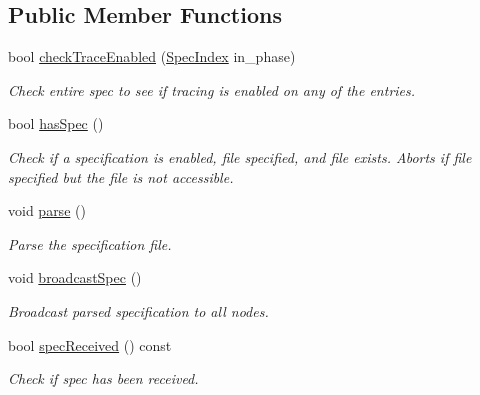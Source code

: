 \subsection*{Public Member Functions}
\begin{DoxyCompactItemize}
\item 
bool \hyperlink{structvt_1_1trace_1_1file__spec_1_1_trace_spec_adf331a01f94b57cb9229c89311f1bcda}{check\+Trace\+Enabled} (\hyperlink{structvt_1_1trace_1_1file__spec_1_1_trace_spec_a4dd2e8fb971930351812d0f286baece2}{Spec\+Index} in\+\_\+phase)
\begin{DoxyCompactList}\small\item\em Check entire spec to see if tracing is enabled on any of the entries. \end{DoxyCompactList}\item 
bool \hyperlink{structvt_1_1trace_1_1file__spec_1_1_trace_spec_ad83e3bc71e3ebcd794fc38e7c2b7a74c}{has\+Spec} ()
\begin{DoxyCompactList}\small\item\em Check if a specification is enabled, file specified, and file exists. Aborts if file specified but the file is not accessible. \end{DoxyCompactList}\item 
void \hyperlink{structvt_1_1trace_1_1file__spec_1_1_trace_spec_ac336bccc75406f56c2888b07e73e9355}{parse} ()
\begin{DoxyCompactList}\small\item\em Parse the specification file. \end{DoxyCompactList}\item 
void \hyperlink{structvt_1_1trace_1_1file__spec_1_1_trace_spec_a3a5ececf49f827a057a7bea8ac7e7584}{broadcast\+Spec} ()
\begin{DoxyCompactList}\small\item\em Broadcast parsed specification to all nodes. \end{DoxyCompactList}\item 
bool \hyperlink{structvt_1_1trace_1_1file__spec_1_1_trace_spec_aba7577d831109f8459e5378db392e717}{spec\+Received} () const
\begin{DoxyCompactList}\small\item\em Check if spec has been received. \end{DoxyCompactList}\end{DoxyCompactItemize}
